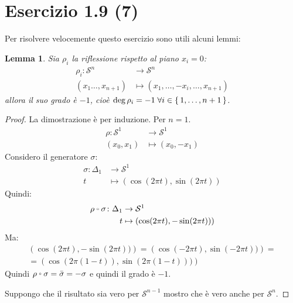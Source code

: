 \documentclass[10pt]{scrartcl}
\newcounter{lemmac}
\newtheorem{lemma}[lemmac]{Lemma}
\newcommand{\Sph}[1][]{\mathcal{S}^#1}
\let\latexcirc=\circ
\newcommand{\ccirc}{\mathbin{\mathchoice
  {\xcirc\scriptstyle}
  {\xcirc\scriptstyle}
  {\xcirc\scriptscriptstyle}
  {\xcirc\scriptscriptstyle}
}}
\newcommand{\xcirc}[1]{\vcenter{\hbox{$#1\latexcirc$}}}
\let\circ\ccirc
\begin{document}
\section{Esercizio 1.9 (7)}
\label{esercizio:grado_sfere}
Per risolvere velocemente questo esercizio sono utili alcuni lemmi:
\begin{lemma}
  Sia $ \rho_i $ la riflessione rispetto al piano $ x_i = 0 $:
  \begin{align*}
    \rho_i \colon \Sph{n} & \to \Sph{n} \\
    (x_1\dots, x_{n+1}) & \mapsto (x_1,\dots,-x_i, \dots, x_{n+1})
  \end{align*}
  allora il suo grado è $ -1 $, cioè $ \deg \rho_i = -1 \; \forall i \in \set{1, \dots, n+1} $.
\end{lemma}
\begin{proof}
  La dimostrazione è per induzione.
    Per $ n = 1 $.
  \begin{align*}
    \rho \colon \Sph{1} & \to \Sph{1} \\
    (x_0,x_1) & \mapsto (x_0, -x_1)
  \end{align*}
  Considero il generatore $ \sigma $:
  \begin{align*}
    \sigma \colon \Delta_1 & \to \Sph{1} \\
    t & \mapsto \left(\cos(2 \pi t), \sin(2 \pi t)\right)
  \end{align*}
  Quindi:
  \begin{align*}
    \rho \circ \sigma \colon \Delta_1 & \to \Sph{1} \\
    t & \mapsto \left(\cos(2 \pi t), -\sin(2 \pi t))\right)
  \end{align*}
  Ma:
  \begin{gather*}
    \left(\cos(2 \pi t), -\sin(2 \pi t))\right) = \left(\cos(-2 \pi t), \sin(-2 \pi t))\right) = \\
    = \left(\cos(2 \pi (1-t)), \sin(2 \pi (1-t)))\right)
  \end{gather*}
  Quindi $ \rho \circ \sigma = \bar{\sigma} = - \sigma $ e quindi il grado è $ - 1 $.

  Suppongo che il risultato sia vero per $ \Sph{n-1} $ mostro che è vero anche per $ \Sph{n} $.


\end{proof}
\end{document}
